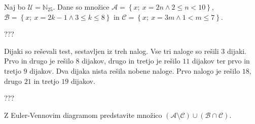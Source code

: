 \documentclass[addpoints,12pt]{exam}
\begin{document}
\begin{questions}
    \newpage

    \question
    Naj bo $\mathcal{U}=\mathbb{N}_{25}$. Dane so množice $\mathcal{A}=\left\{x;\ x=2n \land 2\leq n<10\right\}$, $\mathcal{B}=\left\{x;\ x=2k-1 \land 3\leq k\leq 8\right\}$ in $\mathcal{C}=\left\{x;\ x=3m \land 1<m\leq 7\right\}$. 

    \begin{solution}[8cm]
        ???
            \end{solution}

\newpage
    \question[5]
    Dijaki so reševali test, sestavljen iz treh nalog. Vse tri naloge so rešili $3$ dijaki. 
    Prvo in drugo je rešilo $8$ dijakov, drugo in tretjo je rešilo $11$ dijakov ter prvo in tretjo $9$ dijakov.
    Dva dijaka nista rešila nobene naloge. Prvo nalogo je rešilo $18$, drugo $21$ in tretjo $19$ dijakov.

    \begin{solution}[8cm]
        ???
            \end{solution}




    \newpage
    \question[2]
    Z Euler-Vennovim diagramom predstavite množico $(\mathcal{A}\setminus\mathcal{C})\cup(\mathcal{B}\cap\mathcal{C})$.
    

\end{questions}
\end{document}
